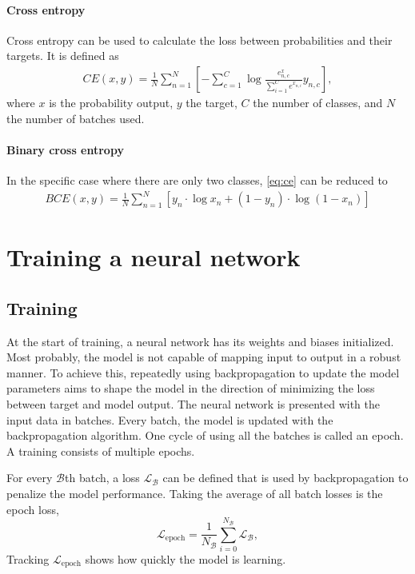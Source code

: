 \paragraph{Cross entropy}
Cross entropy can be used to calculate the loss between probabilities and their targets.
It is defined as
\begin{align}\label{eq:ce}
    CE(x, y) = \frac{1}{N}\sum_{n=1}^N [-\sum_{c=1}^C \log \frac{e^x_{n,c}}{\sum_{i=1}^C e^{x_{n,i}}} y_{n,c}],
\end{align}
where $x$ is the probability output, $y$ the target, $C$ the number of classes, and $N$ the number of batches used.

\paragraph{Binary cross entropy}
In the specific case where there are only two classes, \cref{eq:ce} can be reduced to
\begin{align}
    BCE(x, y) = \frac{1}{N}\sum_{n=1}^N [y_n \cdot \log x_n + (1 - y_n) \cdot \log (1-x_n)]
\end{align}


\section{Training a neural network}

\subsection{Training}\label{Training}
At the start of training, a neural network has its weights and biases initialized.
Most probably, the model is not capable of mapping input to output in a robust manner.
To achieve this, repeatedly using backpropagation to update the model parameters aims to shape the model in the direction of minimizing the loss between target and model output.
The neural network is presented with the input data in batches.
Every batch, the model is updated with the backpropagation algorithm.
One cycle of using all the batches is called an epoch.
A training consists of multiple epochs.

For every $\mathcal{B}$th batch, a loss $\mathcal{L}_\mathcal{B}$ can be defined that is used by backpropagation to penalize the model performance.
Taking the average of all batch losses is the epoch loss,
\begin{equation}
    \mathcal{L}_\mathrm{epoch} = \frac{1}{N_\mathcal{B}}\sum_{i=0}^{N_\mathcal{B}}\mathcal{L}_\mathcal{B},
\end{equation}
Tracking $\mathcal{L}_\mathrm{epoch}$ shows how quickly the model is learning.

